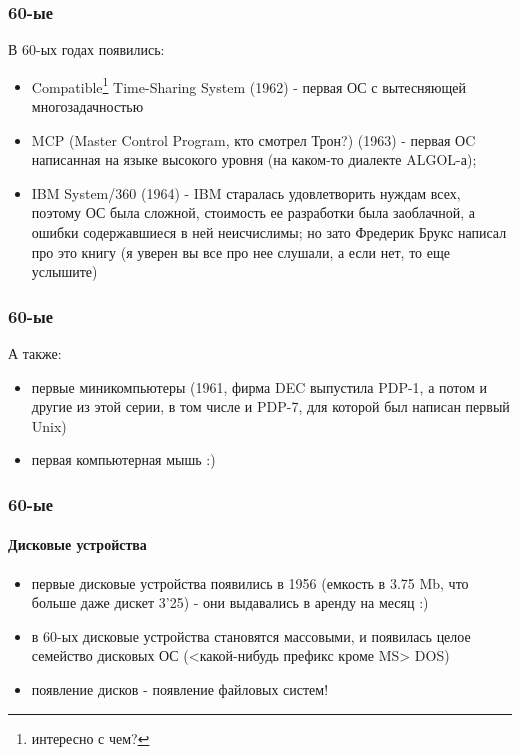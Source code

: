 \begin{frame}
\frametitle{60-ые}

В 60-ых годах появились:
\begin{itemize}
  \item Compatible\footnote{интересно с чем?} Time-Sharing System (1962) -
        первая ОС с вытесняющей многозадачностью
  \item MCP (Master Control Program, кто смотрел Трон?) (1963) - первая ОC
        написанная на языке высокого уровня (на каком-то диалекте ALGOL-а);
  \item IBM System/360 (1964) - IBM старалась удовлетворить нуждам всех, поэтому
        ОС была сложной, стоимость ее разработки была заоблачной, а ошибки
        содержавшиеся в ней неисчислимы; но зато Фредерик Брукс написал про это
        книгу (я уверен вы все про нее слушали, а если нет, то еще услышите)
\end{itemize}
\end{frame}

\begin{frame}
\frametitle{60-ые}

А также:
\begin{itemize}
  \item первые миникомпьютеры (1961, фирма DEC выпустила PDP-1, а потом и другие
        из этой серии, в том числе и PDP-7, для которой был написан первый Unix)
  \item первая компьютерная мышь :)
\end{itemize}
\end{frame}

\begin{frame}
\frametitle{60-ые}
\framesubtitle{Дисковые устройства}

\begin{itemize}
  \item первые дисковые устройства появились в 1956 (емкость в 3.75 Mb, что
        больше даже дискет 3'25) - они выдавались в аренду на месяц :)
  \item в 60-ых дисковые устройства становятся массовыми, и появилась целое
        семейство дисковых ОС (<какой-нибудь префикс кроме MS> DOS)
  \item появление дисков - появление файловых систем!
\end{itemize}
\end{frame}
